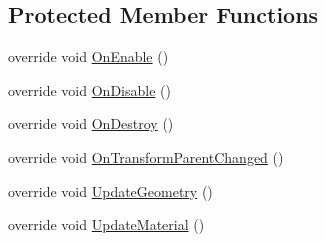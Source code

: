 \subsection*{Protected Member Functions}
\begin{DoxyCompactItemize}
\item 
override void \mbox{\hyperlink{class_t_m_pro_1_1_t_m_p___sub_mesh_u_i_a685c041796705a824e2432c1cf075db6}{On\+Enable}} ()
\item 
override void \mbox{\hyperlink{class_t_m_pro_1_1_t_m_p___sub_mesh_u_i_a06ee252d51e45e951fdef895135559b4}{On\+Disable}} ()
\item 
override void \mbox{\hyperlink{class_t_m_pro_1_1_t_m_p___sub_mesh_u_i_aebef8466a825a92f2d403efd056f20a6}{On\+Destroy}} ()
\item 
override void \mbox{\hyperlink{class_t_m_pro_1_1_t_m_p___sub_mesh_u_i_a37e6c09ce69b4b53a9245571c981f41c}{On\+Transform\+Parent\+Changed}} ()
\item 
override void \mbox{\hyperlink{class_t_m_pro_1_1_t_m_p___sub_mesh_u_i_a6b99dad67454e0b386bc261e9d11aceb}{Update\+Geometry}} ()
\item 
override void \mbox{\hyperlink{class_t_m_pro_1_1_t_m_p___sub_mesh_u_i_af58b19bacdca0f7738002d4f2601cacc}{Update\+Material}} ()
\end{DoxyCompactItemize}
